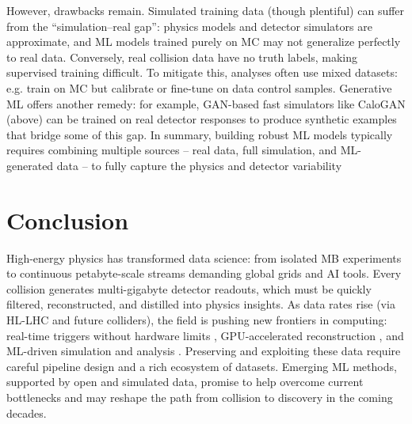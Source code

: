 \documentclass[letterpaper,12pt]{article}
\begin{document}
\begin{spacing}{1.125}
However, drawbacks remain. Simulated training data (though plentiful) can suffer from the “simulation–real gap”: physics models and detector simulators are approximate, and ML models trained purely on MC may not generalize perfectly to real data. Conversely, real collision data have no truth labels, making supervised training difficult. To mitigate this, analyses often use mixed datasets: e.g. train on MC but calibrate or fine-tune on data control samples. Generative ML offers another remedy: for example, GAN-based fast simulators like CaloGAN (above) can be trained on real detector responses to produce synthetic examples that bridge some of this gap. In summary, building robust ML models typically requires combining multiple sources – real data, full simulation, and ML-generated data – to fully capture the physics and detector variability


\section{Conclusion}
High-energy physics has transformed data science: from isolated MB experiments to continuous petabyte-scale streams demanding global grids and AI tools. Every collision generates multi-gigabyte detector readouts, which must be quickly filtered, reconstructed, and distilled into physics insights. As data rates rise (via HL-LHC and future colliders), the field is pushing new frontiers in computing: real-time triggers without hardware limits
, GPU-accelerated reconstruction
, and ML-driven simulation and analysis
. Preserving and exploiting these data require careful pipeline design and a rich ecosystem of datasets. Emerging ML methods, supported by open and simulated data, promise to help overcome current bottlenecks and may reshape the path from collision to discovery in the coming decades.

\end{spacing}
\end{document}
